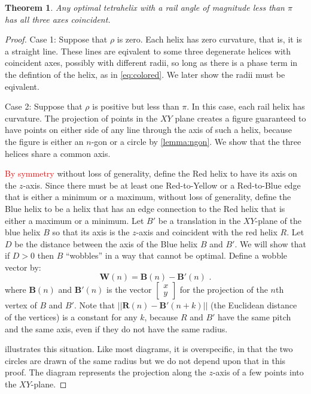 \documentclass[twocolumn,10pt]{asme2ej}
\newtheorem{theorem}{Theorem}
\renewcommand{\vec}[1]{\mathbf{#1}}
\newcommand{\highlighttext}[1] {\textcolor{red}{#1}}
\begin{document}
\begin{theorem}
  Any optimal tetrahelix with a rail angle of magnitude less than $\pi$ has all three
  axes coincident.
  \label{thm:coincident}
\end{theorem}
\begin{proof}
  Case 1: Suppose that $\rho$ is zero.
  Each helix has zero curvature, that is, it is a straight line. These lines are eqivalent
  to some three degenerate helices with coincident axes, possibly with different radii, so long as there is a phase
  term in the defintion of the helix, as in \cref{eq:colored}. We later show the
  radii must be eqivalent.
    
  Case 2: Suppose that $\rho$ is positive but less than $\pi$.
  In this case, each rail helix has
  curvature. The projection of points in the $XY$ plane creates a figure
  guaranteed to have points on either side of any line through the axis of such
  a helix, because the figure is either an $n$-gon or a circle by \cref{lemma:ngon}.
  We show that the three helices share a common axis.

  \highlighttext{By symmetry} without loss of generality, define the Red helix to have its axis on the $z$-axis.
  Since there must be at least one Red-to-Yellow or a Red-to-Blue edge that is either a minimum or a maximum,
  without loss of generality, define the Blue helix to be a helix that
  has an edge connection to the Red helix that is either a maximum or a minimum.
  Let $B'$ be a translation in the $XY$-plane of the blue helix $B$  so that its axis is the $z$-axis and
  coincident with the red helix $R$. Let $D$ be the distance between the axis of the Blue helix
  $B$ and $B'$. We will show that if $D>0$ then $B$ ``wobbles'' in a way that cannot be optimal.
  Define a wobble vector by:
  \begin{equation}
    \vec{W}(n) = \vec{B}(n) - \vec{B}'(n) \text{ .}
  \end{equation}
  where $\vec{B}(n)$ and $\vec{B'}(n)$ is the vector
  $\begin{bmatrix}
    x \\
    y 
  \end{bmatrix}$
  for the projection of the $n$th vertex of $B$ and $B'$. 
  Note that $|| \vec{R}(n) - \vec{B'}(n+k)||$ (the Euclidean distance of the vertices)
  is a constant for any $k$, because $R$ and $B'$ have the
  same pitch and the same axis, even if they do not have the same radius.

   illustrates this situation. Like most diagrams, it is
  overspecific, in that the two circles are drawn of the same radius but we do not
  depend upon that in this proof.  The diagram represents the projection along the
  $z$-axis of a few points into the $XY$-plane.


\end{proof}
\end{document}
